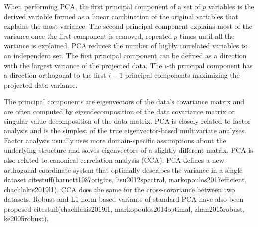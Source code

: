 \documentclass[preprint,12pt]{elsarticle}
\begin{document}
When performing PCA, the first principal component of a set of $p$ variables is the derived variable formed as a linear combination of the original variables that explains the most variance. The second principal component explains most of the variance once the first component is removed, repeated $p$ times until all the variance is explained. PCA reduces the number of highly correlated variables to an independent set. The first principal component can be defined as a direction with the largest variance of the projected data. The $i$-th principal component has a direction orthogonal to the first $i-1$ principal components maximizing the projected data variance.

The principal components are eigenvectors of the data's covariance matrix and are often computed by eigendecomposition of the data covariance matrix or singular value decomposition of the data matrix. PCA is closely related to factor analysis and is the simplest of the true eigenvector-based multivariate analyses. Factor analysis usually uses more domain-specific assumptions about the underlying structure and solves eigenvectors of a slightly different matrix. PCA is also related to canonical correlation analysis (CCA). PCA defines a new orthogonal coordinate system that optimally describes the variance in a single dataset citestuff(barnett1987origins, hsu2012spectral, markopoulos2017efficient, chachlakis2019l1). CCA does the same for the cross-covariance between two datasets. Robust and L1-norm-based variants of standard PCA have also been proposed citestuff(chachlakis2019l1, markopoulos2014optimal, zhan2015robust, ke2005robust).
\end{document}
